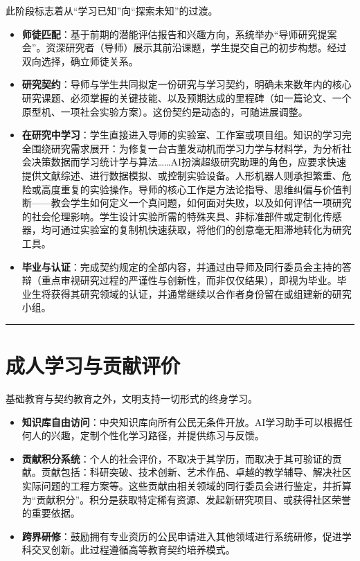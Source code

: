 此阶段标志着从``学习已知''向``探索未知''的过渡。

\begin{itemize}
\item
  \textbf{师徒匹配}：基于前期的潜能评估报告和兴趣方向，系统举办``导师研究提案会''。资深研究者（导师）展示其前沿课题，学生提交自己的初步构想。经过双向选择，确立师徒关系。
\item
  \textbf{研究契约}：导师与学生共同拟定一份研究与学习契约，明确未来数年内的核心研究课题、必须掌握的关键技能、以及预期达成的里程碑（如一篇论文、一个原型机、一项社会实验方案）。这份契约是动态的，可随进展调整。
\item
  \textbf{在研究中学习}：学生直接进入导师的实验室、工作室或项目组。知识的学习完全围绕研究需求展开：为修复一台古董发动机而学习力学与材料学，为分析社会决策数据而学习统计学与算法\ldots\ldots AI扮演超级研究助理的角色，应要求快速提供文献综述、进行数据模拟、或控制实验设备。人形机器人则承担繁重、危险或高度重复的实验操作。导师的核心工作是方法论指导、思维纠偏与价值判断------教会学生如何定义一个真问题，如何面对失败，以及如何评估一项研究的社会伦理影响。学生设计实验所需的特殊夹具、非标准部件或定制化传感器，均可通过实验室的复制机快速获取，将他们的创意毫无阻滞地转化为研究工具。
\item
  \textbf{毕业与认证}：完成契约规定的全部内容，并通过由导师及同行委员会主持的答辩（重点审视研究过程的严谨性与创新性，而非仅仅结果），即视为毕业。毕业生将获得其研究领域的认证，并通常继续以合作者身份留在或组建新的研究小组。
\end{itemize}

\begin{center}\rule{0.5\linewidth}{0.5pt}\end{center}

\section{成人学习与贡献评价}\label{ux6210ux4ebaux5b66ux4e60ux4e0eux8d21ux732eux8bc4ux4ef7}

基础教育与契约教育之外，文明支持一切形式的终身学习。

\begin{itemize}
\item
  \textbf{知识库自由访问}：中央知识库向所有公民无条件开放。AI学习助手可以根据任何人的兴趣，定制个性化学习路径，并提供练习与反馈。
\item
  \textbf{贡献积分系统}：个人的社会评价，不取决于其学历，而取决于其可验证的贡献。贡献包括：科研突破、技术创新、艺术作品、卓越的教学辅导、解决社区实际问题的工程方案等。这些贡献由相关领域的同行委员会进行鉴定，并折算为``贡献积分''。积分是获取特定稀有资源、发起新研究项目、或获得社区荣誉的重要依据。
\item
  \textbf{跨界研修}：鼓励拥有专业资历的公民申请进入其他领域进行系统研修，促进学科交叉创新。此过程遵循高等教育契约培养模式。
\end{itemize}

